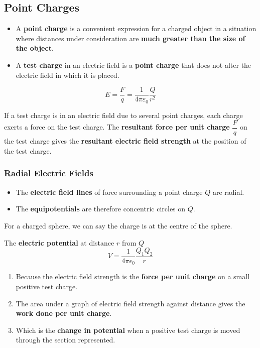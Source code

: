 \subsection{Point Charges}

\begin{itemize}
    \item A \textbf{point charge} is a convenient expression for a charged object in a situation where distances under consideration are \textbf{much greater than the size of the object}.
    \item A \textbf{test charge} in an electric field is a \textbf{point charge} that does not alter the electric field in which it is placed.
\end{itemize}
$$E=\frac{F}{q}=\frac{1}{4\pi\varepsilon_0}\frac{Q}{r^2}$$

If a test charge is in an electric field due to several point charges, each charge exerts a force on the test charge. The \textbf{resultant force per unit charge} $\dfrac{F}{q}$ on the test charge gives the \textbf{resultant electric field strength} at the position of the test charge.

\subsubsection*{Radial Electric Fields}

\begin{itemize}
    \item The \textbf{electric field lines} of force surrounding a point charge $Q$ are radial.
    \item The \textbf{equipotentials} are therefore concentric circles on $Q$.
\end{itemize}

For a charged sphere, we can say the charge is at the centre of the sphere.

The \textbf{electric potential} at distance $r$ from $Q$
$$V=\frac{1}{4\pi\epsilon_0}\frac{Q_1Q_2}{r}$$

\begin{enumerate}
    \item Because the electric field strength is the \textbf{force per unit charge} on a small positive test charge.
    \item The area under a graph of electric field strength against distance gives the \textbf{work done per unit charge}.
    \item Which is the \textbf{change in potential} when a positive test charge is moved through the section represented.
\end{enumerate}
